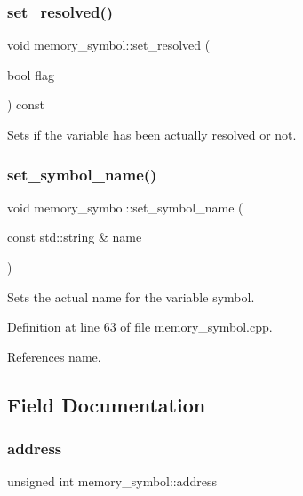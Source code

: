 \subsubsection{\texorpdfstring{set\+\_\+resolved()}{set\_resolved()}}
{\footnotesize\ttfamily void memory\+\_\+symbol\+::set\+\_\+resolved (\begin{DoxyParamCaption}\item[{bool}]{flag }\end{DoxyParamCaption}) const}



Sets if the variable has been actually resolved or not. 

\mbox{\label{classmemory__symbol_ad8e132a569edcf7123101965d45b103a}} 
\subsubsection{\texorpdfstring{set\+\_\+symbol\+\_\+name()}{set\_symbol\_name()}}
{\footnotesize\ttfamily void memory\+\_\+symbol\+::set\+\_\+symbol\+\_\+name (\begin{DoxyParamCaption}\item[{const std\+::string \&}]{name }\end{DoxyParamCaption})}



Sets the actual name for the variable symbol. 



Definition at line 63 of file memory\+\_\+symbol.\+cpp.



References name.



\subsection{Field Documentation}
\mbox{\label{classmemory__symbol_a2d83272ca53bd6831a35d9d99539bd09}} 
\subsubsection{\texorpdfstring{address}{address}}
{\footnotesize\ttfamily unsigned int memory\+\_\+symbol\+::address\hspace{0.3cm}{\ttfamily [private]}}



